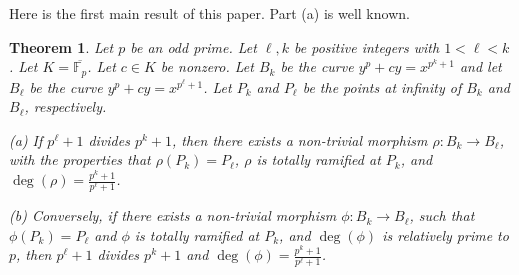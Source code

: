 \documentclass[oneside,a4paper,12pt]{article}
\newcommand{\F}{{\mathbb{F}}}
\theoremstyle{plain} %
\newtheorem{theorem}{Theorem}[section]
\theoremstyle{definition} %
\begin{document}
Here is the first main result of this paper. Part (a) is well known.

\begin{theorem}\label{thm: main}
Let $p$ be an odd prime. Let $\ell, k$ be positive integers with $1<\ell <k$. 
Let $K=\overline{\F_p}$. Let $c \in K$ be nonzero.
Let $B_k$ be the curve $y^p+c y=x^{p^k+1}$ and let 
$B_\ell$ be the curve $y^p+c y=x^{p^\ell +1}$. 
Let $P_k$ and $P_\ell$ be the points at infinity of $B_k$ and $B_\ell$,
respectively.

(a) If $p^\ell +1$  divides $p^k+1$, then
     there exists a non-trivial morphism  
    $\rho : B_{k} \longrightarrow B_{\ell}$, with the properties that
    $\rho(P_k)=P_\ell$, $\rho$ is totally ramified at $P_k$,
    and $\deg (\rho)=\frac{p^k+1}{p^\ell +1}$.

(b) Conversely, if there exists a non-trivial morphism  
    $\phi : B_{k} \longrightarrow B_{\ell}$, such that $\phi (P_k)=P_\ell$ 
    and $\phi$ is totally ramified at $P_k$, 
    and $\deg (\phi)$ is relatively prime to $p$,
    then $p^\ell +1$  divides $p^k+1$ and
    $\deg (\phi)=\frac{p^k+1}{p^\ell +1}$.
\end{theorem}
\end{document}
